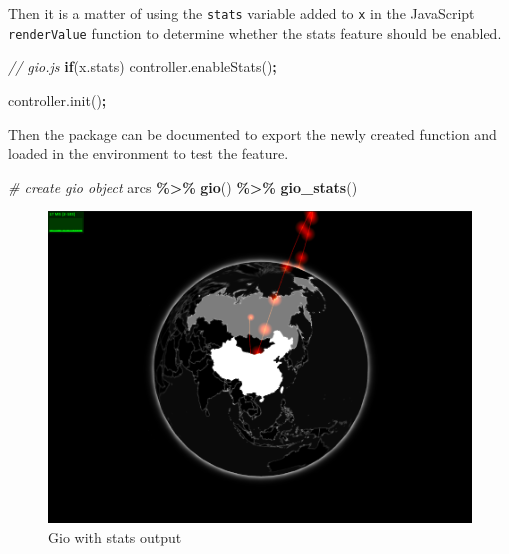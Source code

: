 \documentclass[
]{krantz}
\makeatletter
\newenvironment{Shaded}{\begin{snugshade}}{\end{snugshade}}
\newcommand{\AttributeTok}[1]{\textcolor[rgb]{0.61,0.61,0.61}{#1}}
\newcommand{\CommentTok}[1]{\textcolor[rgb]{0.37,0.37,0.37}{\textit{#1}}}
\newcommand{\ControlFlowTok}[1]{\textcolor[rgb]{0.27,0.27,0.27}{\textbf{#1}}}
\newcommand{\KeywordTok}[1]{\textcolor[rgb]{0.27,0.27,0.27}{\textbf{#1}}}
\newcommand{\NormalTok}[1]{#1}
\newcommand{\OperatorTok}[1]{\textcolor[rgb]{0.43,0.43,0.43}{\textbf{#1}}}
\newcommand{\StringTok}[1]{\textcolor[rgb]{0.5,0.5,0.5}{#1}}
\newcommand{\VariableTok}[1]{\textcolor[rgb]{0,0,0}{#1}}
\newenvironment{kframe}{%
\medskip{}
\setlength{\fboxsep}{.8em}
 \def\at@end@of@kframe{}%
 \ifinner\ifhmode%
  \def\at@end@of@kframe{\end{minipage}}%
  \begin{minipage}{\columnwidth}%
 \fi\fi%
 \def\FrameCommand##1{\hskip\@totalleftmargin \hskip-\fboxsep
 \colorbox{shadecolor}{##1}\hskip-\fboxsep
     \hskip-\linewidth \hskip-\@totalleftmargin \hskip\columnwidth}%
 \MakeFramed {\advance\hsize-\width
   \@totalleftmargin\z@ \linewidth\hsize
   \@setminipage}}%
 {\par\unskip\endMakeFramed%
 \at@end@of@kframe}
\renewenvironment{Shaded}{\begin{kframe}}{\end{kframe}}
\makeatother
\begin{document}
Then it is a matter of using the \texttt{stats} variable added to \texttt{x} in the JavaScript \texttt{renderValue} function to determine whether the stats feature should be enabled.

\begin{Shaded}
\begin{Highlighting}[]
\CommentTok{// gio.js}
\ControlFlowTok{if}\NormalTok{(}\VariableTok{x}\NormalTok{.}\AttributeTok{stats}\NormalTok{)}
  \VariableTok{controller}\NormalTok{.}\AttributeTok{enableStats}\NormalTok{()}\OperatorTok{;}

\VariableTok{controller}\NormalTok{.}\AttributeTok{init}\NormalTok{()}\OperatorTok{;}
\end{Highlighting}
\end{Shaded}

Then the package can be documented to export the newly created function and loaded in the environment to test the feature.

\begin{Shaded}
\begin{Highlighting}[]
\CommentTok{\# create gio object}
\NormalTok{arcs }\OperatorTok{\%>\%}\StringTok{ }
\StringTok{  }\KeywordTok{gio}\NormalTok{() }\OperatorTok{\%>\%}\StringTok{ }
\StringTok{  }\KeywordTok{gio\_stats}\NormalTok{()}
\end{Highlighting}
\end{Shaded}

\begin{figure}[t]

{\centering \includegraphics[width=1\linewidth]{images/stats} 

}

\caption{Gio with stats output}\label{fig:gio-stats}
\end{figure}
\end{document}
